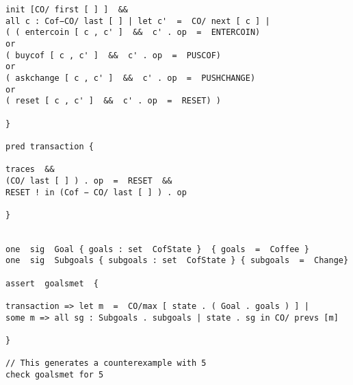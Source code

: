 \documentclass[a4paper,12pt]{extarticle}
\begin{document}
\begin{verbatim}
init [CO/ first [ ] ]  &&
all c : Cof−CO/ last [ ] | let c'  =  CO/ next [ c ] |
( ( entercoin [ c , c' ]  &&  c' . op  =  ENTERCOIN)
or
( buycof [ c , c' ]  &&  c' . op  =  PUSCOF)
or
( askchange [ c , c' ]  &&  c' . op  =  PUSHCHANGE)
or
( reset [ c , c' ]  &&  c' . op  =  RESET) )

}

pred transaction {

traces  &&
(CO/ last [ ] ) . op  =  RESET  &&
RESET ! in (Cof − CO/ last [ ] ) . op

}


one  sig  Goal { goals : set  CofState }  { goals  =  Coffee }
one  sig  Subgoals { subgoals : set  CofState } { subgoals  =  Change}

assert  goalsmet  {

transaction => let m  =  CO/max [ state . ( Goal . goals ) ] |
some m => all sg : Subgoals . subgoals | state . sg in CO/ prevs [m]

}

// This generates a counterexample with 5
check goalsmet for 5
\end{verbatim}
\newpage
\end{document}
